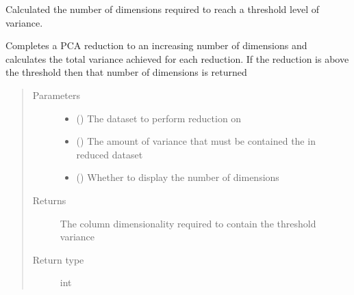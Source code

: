 \documentclass[letterpaper,10pt,english]{sphinxmanual}
\begin{document}
\begin{fulllineitems}
\label{\detokenize{preprocessing:Foresight.preprocessing.dimension_selector}}
Calculated the number of dimensions required to reach a threshold level
of variance.

Completes a PCA reduction to an increasing number of dimensions
and calculates the total variance achieved for each reduction. If the
reduction is above the threshold then that number of dimensions is returned
\begin{quote}\begin{description}
\item[{Parameters}] \leavevmode\begin{itemize}
\item {} 
 () \textendash{} The dataset to perform reduction on

\item {} 
 () \textendash{} The amount of variance that must be
contained the in reduced dataset

\item {} 
 () \textendash{} Whether to display the number of dimensions

\end{itemize}

\item[{Returns}] \leavevmode
The column dimensionality required to
contain the threshold variance

\item[{Return type}] \leavevmode
int

\end{description}\end{quote}

\end{fulllineitems}

\end{document}
